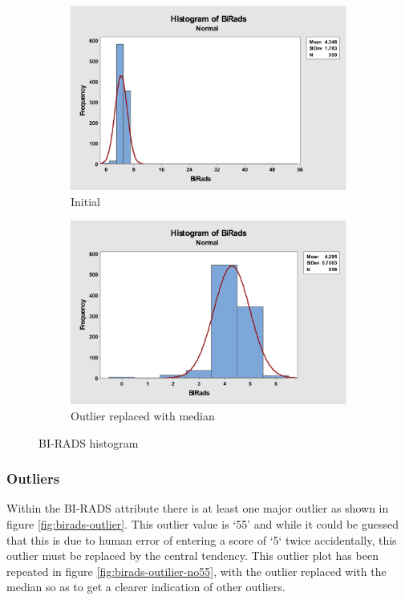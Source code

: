 \documentclass[12pt]{article}
\begin{document}
        \begin{figure}[H]
          \begin{subfigure}[b]{0.45\textwidth}
            \includegraphics[width=\textwidth]{birads-histogram}
            \caption{Initial}
            \label{fig:birads-histogram}
          \end{subfigure}
          \hfill
          \begin{subfigure}[b]{0.45\textwidth}
            \includegraphics[width=\textwidth]{birads-histogram-no55}
            \caption{Outlier replaced with median}
            \label{fig:birads-histogram-no55}
          \end{subfigure}
          \caption{BI-RADS histogram}
          \label{fig:birads-both-histogram}
        \end{figure}

      \subsubsection{Outliers} \label{birad-outlier}
        Within the BI-RADS attribute there is at least one major outlier as shown in figure \ref{fig:birads-outlier}. This outlier value is ‘55’ and while it could be guessed that this is due to human error of entering a score of ‘5‘ twice accidentally, this outlier must be replaced by the central tendency. This outlier plot has been repeated in figure \ref{fig:birads-outilier-no55}, with the outlier replaced with the median so as to get a clearer indication of other outliers.
\end{document}
